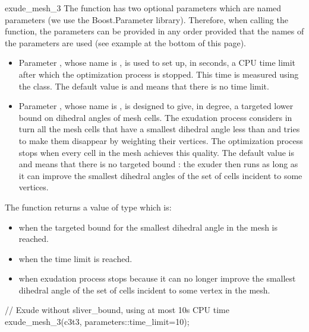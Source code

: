 \begin{ccRefFunction}{exude_mesh_3}
The function has two optional parameters which are named parameters (we use the Boost.Parameter library). 
Therefore, when calling the function,  the parameters can be provided in any order 
provided that the names of the parameters are used
 (see example at the bottom of this page). 
\begin{itemize}
\item
Parameter , whose name is ,
 is used to set up, in seconds,
 a CPU time limit after which the optimization process is stopped. This time is
 measured using the  class.
The default value is  and means that there is no time limit.
\item 
Parameter , whose name is ,
is designed to give, in degree,  a targeted
lower bound on dihedral angles of mesh cells.
The exudation process considers in turn all the mesh cells 
that have a smallest dihedral angle less than 
and tries to make them disappear by weighting their vertices.
The optimization process
stops when every cell in the mesh achieves this quality.
The default value is  and means that  there is no targeted bound : 
the exuder then runs as long as
it can improve the smallest dihedral angles of the set of cells
incident to  some vertices.
\end{itemize}




The function \ccRefName{} returns a value of type 
which is:
\begin{itemize}
\item {} when the targeted bound for the smallest dihedral angle in the mesh is reached.
\item{} when the time limit is reached.
\item {} when exudation process stops because it can no longer improve
the smallest dihedral angle of the set of cells incident to some vertex in the mesh.
\end{itemize}


\ccExample

\begin{ccExampleCode}
// Exude without sliver_bound, using at most 10s CPU time
exude_mesh_3(c3t3, parameters::time_limit=10);
\end{ccExampleCode}

\ccSeeAlso

 \\
 \\
 \\
 \\
 \\


\end{ccRefFunction}

\ccRefPageEnd

